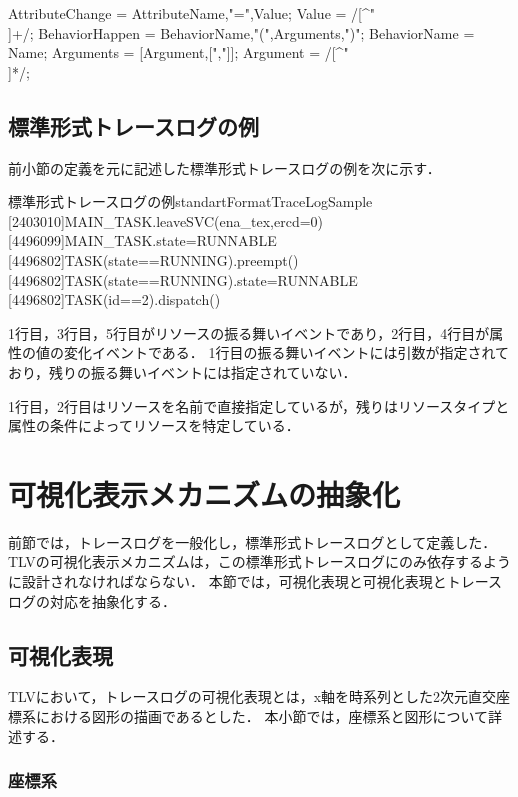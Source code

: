 \begin{EBNF}
AttributeChange = AttributeName,"=",Value;
Value = /[^"\\]+/;
BehaviorHappen =  BehaviorName,"(",Arguments,")";
BehaviorName = Name;
Arguments = [{Argument,[","]}];
Argument = /[^"\\]*/;
\end{EBNF}

\subsection{標準形式トレースログの例}

前小節の定義を元に記述した標準形式トレースログの例を次に示す．

\begin{File}{標準形式トレースログの例}{standartFormatTraceLogSample}
[2403010]MAIN_TASK.leaveSVC(ena_tex,ercd=0)
[4496099]MAIN_TASK.state=RUNNABLE
[4496802]TASK(state==RUNNING).preempt()
[4496802]TASK(state==RUNNING).state=RUNNABLE
[4496802]TASK(id==2).dispatch()
\end{File}

1行目，3行目，5行目がリソースの振る舞いイベントであり，2行目，4行目が属性の値の変化イベントである．
1行目の振る舞いイベントには引数が指定されており，残りの振る舞いイベントには指定されていない．

1行目，2行目はリソースを名前で直接指定しているが，残りはリソースタイプと属性の条件によってリソースを特定している．

\section{可視化表示メカニズムの抽象化}

前節では，トレースログを一般化し，標準形式トレースログとして定義した．
TLVの可視化表示メカニズムは，この標準形式トレースログにのみ依存するように設計されなければならない．
本節では，可視化表現と可視化表現とトレースログの対応を抽象化する．

\subsection{可視化表現}
\label{subsec:visualization}

TLVにおいて，トレースログの可視化表現とは，x軸を時系列とした2次元直交座標系における図形の描画であるとした．
本小節では，座標系と図形について詳述する．

\subsubsection{座標系}

